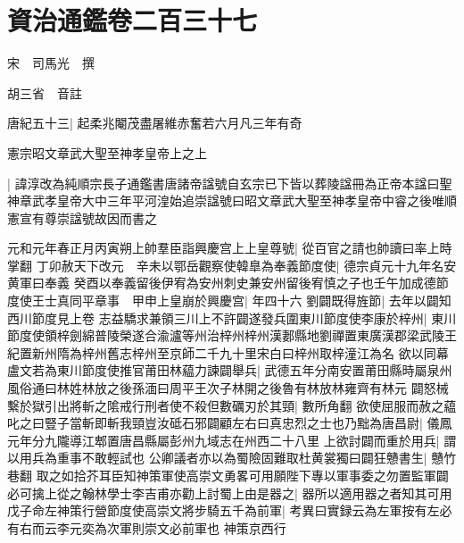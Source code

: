 \section{資治通鑑卷二百三十七}
宋　司馬光　撰

胡三省　音註

唐紀五十三|{
	起柔兆閹茂盡屠維赤奮若六月凡三年有奇}


憲宗昭文章武大聖至神孝皇帝上之上

|{
	諱淳改為純順宗長子通鑑書唐諸帝諡號自玄宗已下皆以葬陵諡冊為正帝本諡曰聖神章武孝皇帝大中三年平河湟始追崇諡號曰昭文章武大聖至神孝皇帝中睿之後唯順憲宣有尊崇諡號故因而書之}


元和元年春正月丙寅朔上帥羣臣詣興慶宫上上皇尊號|{
	從百官之請也帥讀曰率上時掌翻}
丁卯赦天下改元　辛未以鄂岳觀察使韓臯為奉義節度使|{
	德宗貞元十九年名安黄軍曰奉義}
癸酉以奉義留後伊宥為安州刺史兼安州留後宥慎之子也壬午加成德節度使王士真同平章事　甲申上皇崩於興慶宫|{
	年四十六}
劉闢既得旌節|{
	去年以闢知西川節度見上卷}
志益驕求兼領三川上不許闢遂發兵圍東川節度使李康於梓州|{
	東川節度使領梓劍綿普陵榮遂合渝瀘等州治梓州梓州漢郪縣地劉禪置東廣漢郡梁武陵王紀置新州隋為梓州舊志梓州至京師二千九十里宋白曰梓州取梓潼江為名}
欲以同幕盧文若為東川節度使推官莆田林藴力諫闢舉兵|{
	武德五年分南安置莆田縣時屬泉州風俗通曰林姓林放之後孫湎曰周平王次子林開之後魯有林放林雍齊有林元}
闢怒械繫於獄引出將斬之隂戒行刑者使不殺但數礪刃於其頸|{
	數所角翻}
欲使屈服而赦之藴叱之曰豎子當斬即斬我頸豈汝砥石邪闢顧左右曰真忠烈之士也乃黜為唐昌尉|{
	儀鳳元年分九隴導江郫置唐昌縣屬彭州九域志在州西二十八里}
上欲討闢而重於用兵|{
	謂以用兵為重事不敢輕試也}
公卿議者亦以為蜀險固難取杜黄裳獨曰闢狂戇書生|{
	戇竹巷翻}
取之如拾芥耳臣知神策軍使高崇文勇畧可用願陛下專以軍事委之勿置監軍闢必可擒上從之翰林學士李吉甫亦勸上討蜀上由是器之|{
	器所以適用器之者知其可用}
戊子命左神策行營節度使高崇文將步騎五千為前軍|{
	考異曰實録云為左軍按有左必有右而云李元奕為次軍則崇文必前軍也}
神策京西行

